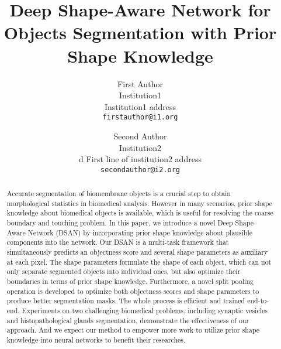 \documentclass[10pt,twocolumn,letterpaper]{article}
\begin{document}
\title{Deep Shape-Aware Network for Objects Segmentation with Prior Shape Knowledge}

\author{First Author\\
Institution1\\
Institution1 address\\
{\tt\small firstauthor@i1.org}
\and
Second Author\\
Institution2\\d
First line of institution2 address\\
{\tt\small secondauthor@i2.org}
}

\maketitle


\begin{abstract}
   Accurate segmentation of biomembrane objects is a crucial step to obtain morphological statistics in biomedical analysis.
   However in many scenarios, prior shape knowledge about biomedical objects is available, which is useful for resolving the coarse boundary and touching problem.
   In this paper, we introduce a novel Deep Shape-Aware Network (DSAN) by incorporating prior shape knowledge about plausible components into the network.
   Our DSAN is a multi-task framework that simultaneously predicts an objectness score and several shape parameters as auxiliary at each pixel.
   The shape parameters formulate the shape of each object, which can not only separate segmented objects into individual ones, but also optimize their boundaries in terms of prior shape knowledge.
   Furthermore, a novel split pooling operation is developed to optimize both objectness scores and shape parameters to produce better segmentation masks.
   The whole process is efficient and trained end-to-end.
   Experiments on two challenging biomedical problems, including synaptic vesicles and histopathological glands segmentation, demonstrate the effectiveness of our approach.
   And we expect our method to empower more work to utilize prior shape
    knowledge into neural networks to benefit their researches.

\end{abstract}
\end{document}

